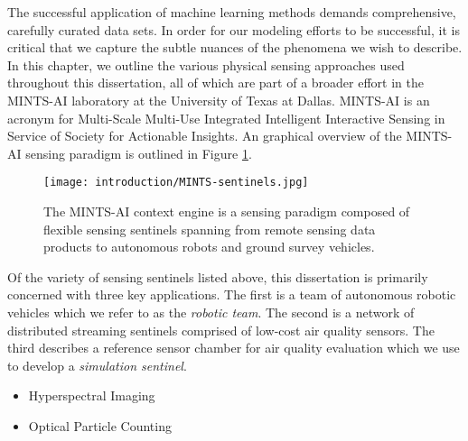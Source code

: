 The successful application of machine learning methods demands comprehensive,
carefully curated data sets. In order for our modeling efforts to be successful,
it is critical that we capture the subtle nuances of the phenomena we wish to
describe. In this chapter, we outline the various physical sensing approaches
used throughout this dissertation, all of which are part of a broader effort in
the MINTS-AI laboratory at the University of Texas at Dallas. MINTS-AI is an
acronym for Multi-Scale Multi-Use Integrated Intelligent Interactive Sensing in
Service of Society for Actionable Insights. An graphical overview of the
MINTS-AI sensing paradigm is outlined in Figure \ref{fig:mints-ai}.


\begin{figure}[!hbt]
  \centering
  \texttt{[image: introduction/MINTS-sentinels.jpg]}
  \caption{The MINTS-AI context engine is a sensing paradigm composed of flexible sensing sentinels spanning from remote sensing data products to autonomous robots and ground survey vehicles.}
  \label{fig:mints-ai}
\end{figure}

Of the variety of sensing sentinels listed above, this dissertation is primarily
concerned with three key applications. The first is a team of autonomous robotic
vehicles which we refer to as the \textit{robotic team}. The second is a network
of distributed streaming sentinels comprised of low-cost air quality sensors.
The third describes a reference sensor chamber for air quality evaluation which
we use to develop a \textit{simulation sentinel}.


\begin{itemize}
  \item Hyperspectral Imaging
  \item Optical Particle Counting
\end{itemize}



